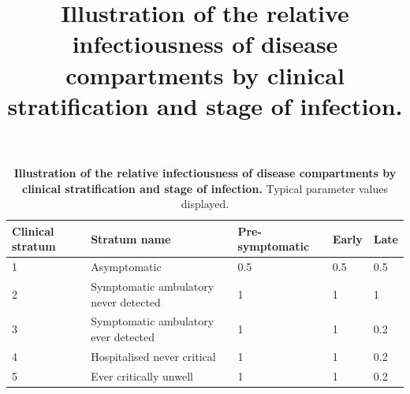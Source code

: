 \begin{table}[ht]
\renewcommand{\baselinestretch}{1}
    \begin{tabular}{| p{2cm} | p{6.6cm} | p{2.5cm} | l | l |}
    	\hline
        \textbf{Clinical stratum} & \textbf{Stratum name} & \textbf{Pre-symptomatic} &\textbf{Early} & \textbf{Late}\\
        \hline
        1 & Asymptomatic & \cellcolor[HTML]{DC6464}\textcolor[HTML]{FFFFFF}{0.5} & 
        \cellcolor[HTML]{DC6464}\textcolor[HTML]{FFFFFF}{0.5} & \cellcolor[HTML]{DC6464}\textcolor[HTML]{FFFFFF}{0.5} \\
        2 & Symptomatic ambulatory never detected & \cellcolor[HTML]{C90000}\textcolor[HTML]{FFFFFF}{1} & \cellcolor[HTML]{C90000}\textcolor[HTML]{FFFFFF}{1} & \cellcolor[HTML]{C90000}\textcolor[HTML]{FFFFFF}{1} \\
        3 & Symptomatic ambulatory ever detected & \cellcolor[HTML]{C90000}\textcolor[HTML]{FFFFFF}{1} & \cellcolor[HTML]{C90000}\textcolor[HTML]{FFFFFF}{1} & \cellcolor[HTML]{F0BEBE}\textcolor[HTML]{FFFFFF}{0.2} \\
        4 & Hospitalised never critical & \cellcolor[HTML]{C90000}\textcolor[HTML]{FFFFFF}{1} & \cellcolor[HTML]{C90000}\textcolor[HTML]{FFFFFF}{1} & \cellcolor[HTML]{F0BEBE}\textcolor[HTML]{FFFFFF}{0.2} \\
        5 & Ever critically unwell & 
        \cellcolor[HTML]{C90000}\textcolor[HTML]{FFFFFF}{1} & \cellcolor[HTML]{C90000}\textcolor[HTML]{FFFFFF}{1} & \cellcolor[HTML]{F0BEBE}\textcolor[HTML]{FFFFFF}{0.2} \\
        \hline
    \end{tabular}
    	\title{Illustration of the relative infectiousness of disease compartments by clinical stratification and stage of infection.}
    \caption{\textbf{Illustration of the relative infectiousness of disease compartments by clinical stratification and stage of infection.} Typical parameter values displayed.}
    \label{tab:clinical}
\end{table}
